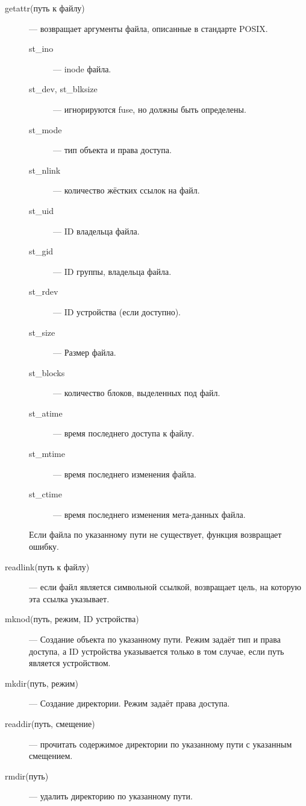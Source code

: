 \documentclass[pdftex,a4paper,11pt]{article}
\begin{document}
\begin{description}

\item[getattr(путь к файлу)] --- возвращает аргументы файла, описанные в стандарте POSIX.

\begin{description}

\item[st\_ino] --- inode файла.
\item[st\_dev, st\_blksize] --- игнорируются fuse, но должны быть определены.
\item[st\_mode] --- тип объекта и права доступа.
\item[st\_nlink] --- количество жёстких ссылок на файл.
\item[st\_uid] --- ID владельца файла.
\item[st\_gid] --- ID группы, владельца файла.
\item[st\_rdev] --- ID устройства (если доступно).
\item[st\_size] --- Размер файла.
\item[st\_blocks] --- количество блоков, выделенных под файл.
\item[st\_atime] --- время последнего доступа к файлу.
\item[st\_mtime] --- время последнего изменения файла.
\item[st\_ctime] --- время последнего изменения мета-данных файла.

\end{description}

Если файла по указанному пути не существует, функция возвращает ошибку.

\item[readlink(путь к файлу)] --- если файл является символьной ссылкой, возвращает цель, на которую эта ссылка указывает.

\item[mknod(путь, режим, ID устройства)] --- Создание объекта по указанному пути. Режим задаёт тип и права доступа, а ID устройства указывается только в том случае, если путь является устройством.

\item[mkdir(путь, режим)] --- Создание директории. Режим задаёт права доступа.

\item[readdir(путь, смещение)] --- прочитать содержимое директории по указанному пути с указанным смещением.

\item[rmdir(путь)] --- удалить директорию по указанному пути.


\end{description}
\end{document}
